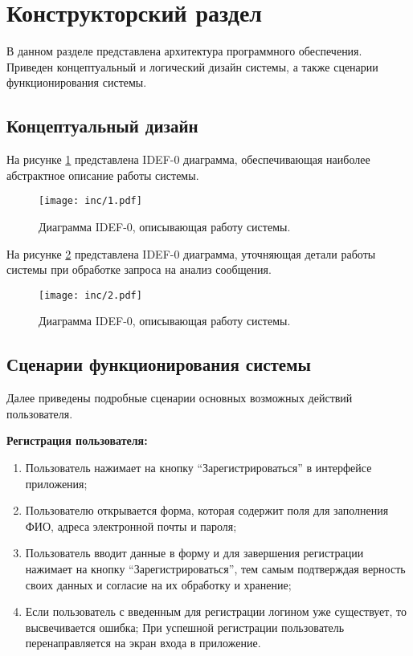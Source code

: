 \section{Конструкторский раздел}

В данном разделе представлена архитектура программного обеспечения. Приведен концептуальный и логический дизайн системы, а также сценарии функционирования системы.

\subsection{Концептуальный дизайн}

На рисунке \ref{img:idef} представлена IDEF-0 диаграмма, обеспечивающая наиболее абстрактное описание работы системы.

\begin{figure}[H]
	\centering
	\texttt{[image: inc/1.pdf]}
	\caption{ Диаграмма IDEF-0, описывающая работу системы.}
	\label{img:idef}
\end{figure}


На рисунке \ref{img:idef1} представлена IDEF-0 диаграмма, уточняющая детали работы системы при обработке запроса на анализ сообщения.

\begin{figure}[H]
	\centering
	\texttt{[image: inc/2.pdf]}
	\caption{ Диаграмма IDEF-0, описывающая работу системы.}
	\label{img:idef1}
\end{figure}

\subsection{Сценарии функционирования системы}
Далее приведены подробные сценарии основных возможных действий пользователя.

\textbf{Регистрация пользователя:}
\begin{enumerate}
\item Пользователь нажимает на кнопку ``Зарегистрироваться'' в интерфейсе приложения;
\item Пользователю открывается форма, которая содержит поля для заполнения ФИО, адреса электронной почты и пароля;
\item Пользователь вводит данные в форму и для завершения регистрации нажимает на кнопку ``Зарегистрироваться'', тем самым подтверждая верность своих данных и согласие на их обработку и хранение;
\item Если пользователь с введенным для регистрации логином уже существует, то высвечивается ошибка; При успешной регистрации пользователь перенаправляется на экран входа в приложение.
\end{enumerate}


